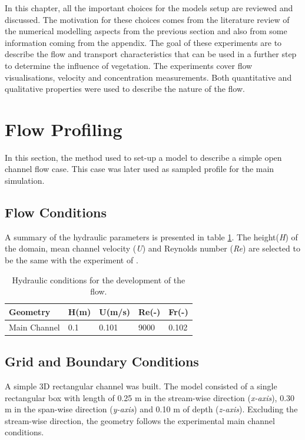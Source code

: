 \begin{refsection}
In this chapter, all the important choices for the models setup are reviewed and discussed. The motivation for
these choices comes from the literature review of the numerical modelling aspects from the previous section
and also from some information coming from the appendix. The goal of these experiments are to describe the flow and transport characteristics that can be used in a further step to determine the influence of vegetation. The experiments cover flow visualisations, velocity and concentration measurements. Both quantitative and qualitative properties were used to describe the nature of the flow.

\section{Flow Profiling}
In this section, the method used to set-up a model to describe a simple open channel flow case. This case was later used as sampled profile for the main simulation.
\subsection{Flow Conditions}
\label{sec:flowConditions}
A summary of the hydraulic parameters is presented in table \ref{tab:inlet}. The height(\textit{H}) of the domain, mean channel velocity (\textit{U}) and Reynolds number (\textit{Re}) are selected to be the same with the experiment of \textcite{xiang2019}.
\begin{table}[]
\centering
\caption{Hydraulic conditions for the development of the flow.}
\label{tab:inlet}
\begin{tabular}{lllll}
Geometry     & H(m) & U(m/s) & Re(-) & Fr(-) \\ \hline
Main Channel & 0.1  & 0.101  & 9000  & 0.102
\end{tabular}
\end{table}

\subsection{Grid and Boundary Conditions}
A simple 3D rectangular channel was built. The model consisted of a single rectangular box with length of 0.25 m in the stream-wise direction (\textit{x-axis}), 0.30 m in the span-wise direction (\textit{y-axis}) and 0.10 m of depth (\textit{z-axis}). Excluding the stream-wise direction, the geometry follows the experimental main channel conditions.


\end{refsection}
